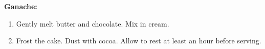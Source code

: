 \textbf{Ganache:}

\begin{ingredients}
\end{ingredients}


\begin{recipe}
  \begin{enumerate}

  \item Gently melt butter and chocolate.  Mix in cream.

  \item Frost the cake.  Dust with cocoa.  Allow to rest at least an
    hour before serving.

  \end{enumerate}
\end{recipe}

